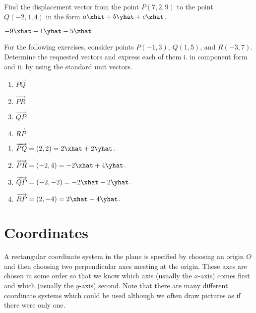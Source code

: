 \begin{exercises}
    \begin{problist}
        \prob   Find the displacement vector
        from the point $P(7, 2, 9)$ to the point $Q(-2, 1, 4)$
        in the form $a\xhat + b\yhat + c\zhat$.
        \begin{solution}
            $-9\xhat-1\yhat-5\zhat$
        \end{solution}

        \prob[\openstax]   For the following exercises, consider points $P(-1,3)$, $Q(1,5)$, and $R(-3,7)$.
        Determine the requested vectors and express each of them i. in component form
        and ii. by using the standard unit vectors.
        \begin{enumerate}
            \item $\overrightarrow{PQ}$
            \item $\overrightarrow{PR}$
            \item $\overrightarrow{QP}$
            \item $\overrightarrow{RP}$
        \end{enumerate}
        \begin{solution}
            \begin{enumerate}
                \item   $\overrightarrow{PQ} = (2,2) = 2\xhat + 2\yhat$.
                \item   $\overrightarrow{PR} = (-2, 4) = -2\xhat + 4\yhat$.
                \item   $\overrightarrow{QP} = (-2,-2) = -2\xhat - 2\yhat$.
                \item   $\overrightarrow{RP} = (2, -4) = 2\xhat - 4\yhat$.
            \end{enumerate}
        \end{solution}
    \end{problist}
\end{exercises}


\section{Coordinates}
A rectangular coordinate system in the plane is specified by choosing
an origin $O$ and then choosing two perpendicular axes meeting at
the origin.  These axes are chosen in some order so that we know which
axis (usually the $x$-axis) comes first and which (usually the
$y$-axis) second.   Note that there are many different coordinate systems
which could be used although we often draw pictures
as if there were only one.


